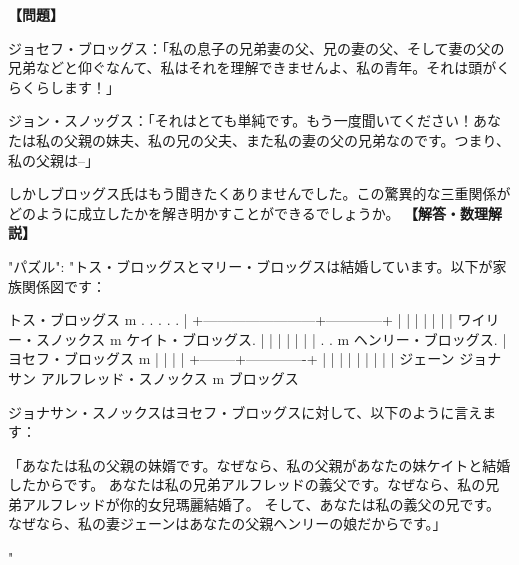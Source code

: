 \documentclass[10pt,a4paper,oneside,openany]{ltjsbook}
\begin{document}
\begin{tcolorbox}[colback=softblue,colframe=primaryblue,title=\textbf{第 55 問：A MIXED PEDIGREE.},arc=2mm,boxrule=1pt,breakable]
\textbf{【問題】}\par\vspace{0.3em}
ジョセフ・ブロッグス：「私の息子の兄弟妻の父、兄の妻の父、そして妻の父の兄弟などと仰ぐなんて、私はそれを理解できませんよ、私の青年。それは頭がくらくらします！」

ジョン・スノッグス：「それはとても単純です。もう一度聞いてください！あなたは私の父親の妹夫、私の兄の父夫、また私の妻の父の兄弟なのです。つまり、私の父親は--」

しかしブロッグス氏はもう聞きたくありませんでした。この驚異的な三重関係がどのように成立したかを解き明かすことができるでしょうか。
\tcblower
\textbf{【解答・数理解説】}\par\vspace{0.3em}
{
  "パズル": "トス・ブロッグスとマリー・ブロッグスは結婚しています。以下が家族関係図です：

                                     トス・ブロッグス  m . . . . .
                                                   |
                    +------------------------+------------+
                    |                        |            |
                    |                        |            |
                    |    ワイリー・スノックス m ケイト・ブロッグス.         |
                    |              |                      |
                    |              |                      |
       . . m ヘンリー・ブロッグス.         |                ヨセフ・ブロッグス m
           |                       |                              |
           |              +--------+-------------+                |
           |              |                      |                |
           |              |                      |                |
         ジェーン            ジョナサン                    アルフレッド・スノックス    m     ブロッグス

ジョナサン・スノックスはヨセフ・ブロッグスに対して、以下のように言えます：

「あなたは私の父親の妹婿です。なぜなら、私の父親があなたの妹ケイトと結婚したからです。
あなたは私の兄弟アルフレッドの義父です。なぜなら、私の兄弟アルフレッドが你的女兒瑪麗結婚了。
そして、あなたは私の義父の兄です。なぜなら、私の妻ジェーンはあなたの父親ヘンリーの娘だからです。」

"}
\end{tcolorbox}
\end{document}
